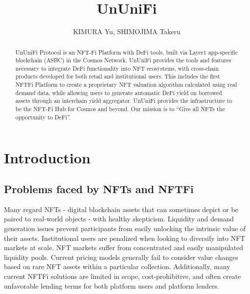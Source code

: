 \documentclass[dvipdfmx]{jsarticle}
\title{UnUniFi}
\author{KIMURA Yu, SHIMOJIMA Takeru}
\begin{document}

\maketitle

\begin{abstract}
  UnUniFi Protocol is an NFT-Fi Platform with DeFi tools, built via Layer1 app-specific blockchain (ASBC) in the Cosmos Network. 
  UnUniFi provides the tools and features necessary to integrate DeFi functionality into NFT ecosystems, with cross-chain products developed for both retail and institutional users. 
  This includes the first NFTFi Platform to create a proprietary NFT valuation algorithm calculated using real demand data, while allowing users to generate automatic DeFi yield on borrowed assets through an interchain yield aggregator. 
  UnUniFi provides the infrastructure to be the NFT-Fi Hub for Cosmos and beyond. 
  Our mission is to “Give all NFTs the opportunity to DeFi”.
\end{abstract}

\section{Introduction}

\subsection{Problems faced by NFTs and NFTFi}
Many regard NFTs - digital blockchain assets that can sometimes depict or be paired to real-world objects - with healthy skepticism. Liquidity and demand generation issues prevent participants from easily unlocking the intrinsic value of their assets. Institutional users are penalized when looking to diversify into NFT markets at scale. NFT markets suffer from concentrated and easily manipulated liquidity pools. Current pricing models generally fail to consider value changes based on rare NFT assets within a particular collection. Additionally, many current NFTFi solutions are limited in scope, cost-prohibitive, and often create unfavorable lending terms for both platform users and platform lenders.
\end{document}

